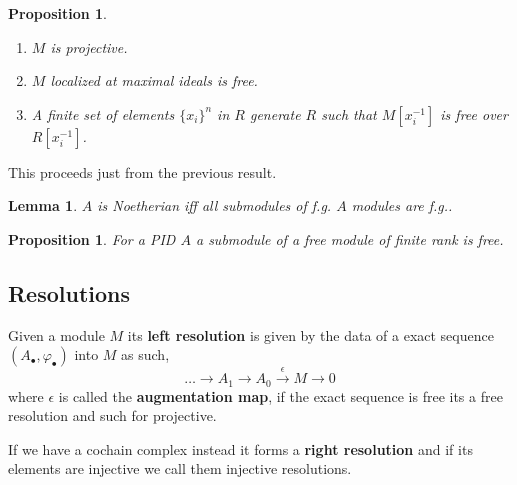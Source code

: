 \documentclass[12pt]{article}
\numberwithin{equation}{section}
\newcounter{dummy} \numberwithin{dummy}{section}
\newtheorem{lemma}[dummy]{Lemma}
\newtheorem{proposition}[dummy]{Proposition}
\begin{document}
\begin{appendices}
\begin{proposition}
		
		\begin{enumerate}
			\item $M$ is projective.
			\item $M$ localized at maximal ideals is free.
			\item A finite set of elements $\{x_i\}^n$ in $R$ generate $R$ such that $M[x_i^{-1}]$ is free over $R[x_i^{-1}]$.
		\end{enumerate}		
	\end{proposition}
	This proceeds just from the previous result.
	\begin{lemma}\label{suboffgisfgnoet}
		$A$ is Noetherian iff all submodules of f.g. $A$ modules are f.g..
	\end{lemma}
	\begin{proposition}\label{submodoffreemodisfreepid}
		For a PID $A$ a submodule of a free module of finite rank is free.
	\end{proposition}

	
	
	
	\subsection{Resolutions}
	Given a module $M$ its \textbf{left resolution} is given by the data of a exact sequence $(A_\bullet, \varphi_\bullet)$ into $M$ as such,
	\[ 	\dots \to A_1	\to A_0 \xrightarrow{\epsilon} M \to 0 \]
	where $\epsilon $ is called the \textbf{augmentation map}, if the exact sequence is free its a free resolution and such for projective. 
	
	If we have a cochain complex instead it forms a \textbf{right resolution} and if its elements are injective we call them injective resolutions.
	

\end{appendices}
\end{document}
